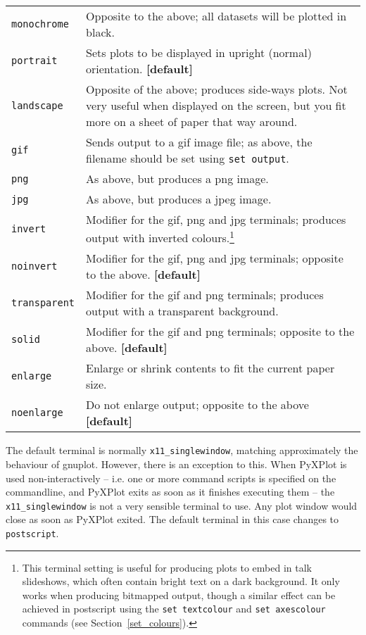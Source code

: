 \documentclass[a4paper,onecolumn,11pt]{book}
\begin{document}
\begin{longtable}{p{3cm}p{9cm}}
\texttt{monochrome} & Opposite to the above; all datasets will be plotted in black.\index{monochrome output}\\
\texttt{portrait} & Sets plots to be displayed in upright (normal) orientation. \textbf{[default]}\index{portrait orientation}\\
\texttt{landscape} & Opposite of the above; produces side-ways plots. Not very useful when displayed on the screen, but you fit more on a sheet of paper that way around.\index{landscape orientation}\\
\texttt{gif} & Sends output to a gif image file; as above, the filename should be set using \texttt{set output}.\index{gif output}\\
\texttt{png} & As above, but produces a png image.\index{png output}\\
\texttt{jpg} & As above, but produces a jpeg image.\index{jpeg output}\\
\texttt{invert} & Modifier for the gif, png and jpg terminals; produces output with inverted colours.\footnote{This terminal setting is useful for producing plots to embed in talk slideshows, which often contain bright text on a dark background. It only works when producing bitmapped output, though a similar effect can be achieved in postscript using the \texttt{set textcolour} and \texttt{set axescolour} commands (see Section~\ref{set_colours}).}\index{colours!inverting}\\
\texttt{noinvert} & Modifier for the gif, png and jpg terminals; opposite to the above. \textbf{[default]}\\
\texttt{transparent} & Modifier for the gif and png terminals; produces output with a transparent background.\index{transparent terminal}\index{gif output!transparency}\index{png output!transparency}\\
\texttt{solid} & Modifier for the gif and png terminals; opposite to the above. \textbf{[default]}\\
\texttt{enlarge} & Enlarge or shrink contents to fit the current paper
size.\index{enlarging output}\\
\texttt{noenlarge} & Do not enlarge output; opposite to the above \textbf{[default]}\\
\end{longtable}
\label{terminals}

The default terminal is normally \texttt{x11\_singlewindow}, matching
approximately the behaviour of gnuplot. However, there is an exception to this.
When PyXPlot is used non-interactively -- i.e. one or more command scripts is
specified on the commandline, and PyXPlot exits as soon as it finishes
executing them -- the \texttt{x11\_singlewindow} is not a very sensible
terminal to use. Any plot window would close as soon as PyXPlot exited. The
default terminal in this case changes to \texttt{postscript}.
\end{document}
